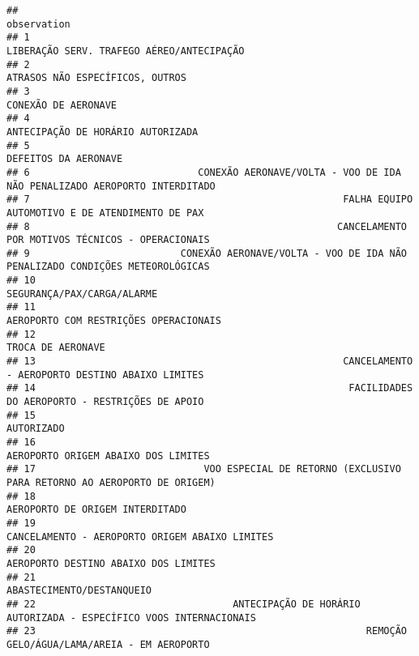 \documentclass[
]{article}
\begin{document}
\begin{verbatim}
##                                                                                            observation
## 1                                                            LIBERAÇÃO SERV. TRAFEGO AÉREO/ANTECIPAÇÃO
## 2                                                                      ATRASOS NÃO ESPECÍFICOS, OUTROS
## 3                                                                                  CONEXÃO DE AERONAVE
## 4                                                                    ANTECIPAÇÃO DE HORÁRIO AUTORIZADA
## 5                                                                                 DEFEITOS DA AERONAVE
## 6                             CONEXÃO AERONAVE/VOLTA - VOO DE IDA NÃO PENALIZADO AEROPORTO INTERDITADO
## 7                                                      FALHA EQUIPO AUTOMOTIVO E DE ATENDIMENTO DE PAX
## 8                                                     CANCELAMENTO POR MOTIVOS TÉCNICOS - OPERACIONAIS
## 9                          CONEXÃO AERONAVE/VOLTA - VOO DE IDA NÃO PENALIZADO CONDIÇÕES METEOROLÓGICAS
## 10                                                                          SEGURANÇA/PAX/CARGA/ALARME
## 11                                                               AEROPORTO COM RESTRIÇÕES OPERACIONAIS
## 12                                                                                   TROCA DE AERONAVE
## 13                                                     CANCELAMENTO - AEROPORTO DESTINO ABAIXO LIMITES
## 14                                                      FACILIDADES DO AEROPORTO - RESTRIÇÕES DE APOIO
## 15                                                                                          AUTORIZADO
## 16                                                                 AEROPORTO ORIGEM ABAIXO DOS LIMITES
## 17                             VOO ESPECIAL DE RETORNO (EXCLUSIVO PARA RETORNO AO AEROPORTO DE ORIGEM)
## 18                                                                     AEROPORTO DE ORIGEM INTERDITADO
## 19                                                      CANCELAMENTO - AEROPORTO ORIGEM ABAIXO LIMITES
## 20                                                                AEROPORTO DESTINO ABAIXO DOS LIMITES
## 21                                                                           ABASTECIMENTO/DESTANQUEIO
## 22                                  ANTECIPAÇÃO DE HORÁRIO AUTORIZADA - ESPECÍFICO VOOS INTERNACIONAIS
## 23                                                         REMOÇÃO GELO/ÁGUA/LAMA/AREIA - EM AEROPORTO

\end{verbatim}
\end{document}
